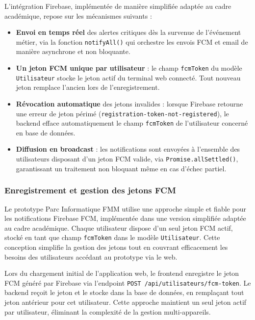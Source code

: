 L'intégration Firebase, implémentée de manière simplifiée adaptée au cadre académique, repose sur les mécanismes suivants :
\begin{itemize}
    \item \textbf{Envoi en temps réel} des alertes critiques dès la survenue
          de l'événement métier, via la fonction \texttt{notifyAll()} qui orchestre
          les envois FCM et email de manière asynchrone et non bloquante.
    \item \textbf{Un jeton FCM unique par utilisateur} : le champ \texttt{fcmToken}
          du modèle \texttt{Utilisateur} stocke le jeton actif du terminal web connecté.
          Tout nouveau jeton remplace l'ancien lors de l'enregistrement.
    \item \textbf{Révocation automatique} des jetons invalides : lorsque Firebase retourne
          une erreur de jeton périmé (\texttt{registration-token-not-registered}),
          le backend efface automatiquement le champ \texttt{fcmToken} de l'utilisateur
          concerné en base de données.
    \item \textbf{Diffusion en broadcast} : les notifications sont envoyées à l'ensemble
          des utilisateurs disposant d'un jeton FCM valide, via \texttt{Promise.allSettled()},
          garantissant un traitement non bloquant même en cas d'échec partiel.
\end{itemize}

\subsubsection{Enregistrement et gestion des jetons FCM}
\label{subsubsec:fcm_tokens}

Le prototype Parc Informatique FMM utilise une approche simple et fiable pour les notifications Firebase FCM, implémentée dans une version simplifiée adaptée au cadre académique. 
Chaque utilisateur dispose d'un seul jeton FCM actif, stocké en tant que champ \texttt{fcmToken} dans le modèle 
\texttt{Utilisateur}. Cette conception simplifie la gestion des jetons tout en couvrant efficacement les besoins 
des utilisateurs accédant au prototype via le web.

Lors du chargement initial de l'application web, le frontend enregistre le jeton FCM généré par Firebase via 
l'endpoint \texttt{POST /api/utilisateurs/fcm-token}. Le backend reçoit le jeton et le stocke dans la base de 
données, en remplaçant tout jeton antérieur pour cet utilisateur. Cette approche maintient un seul jeton actif 
par utilisateur, éliminant la complexité de la gestion multi-appareils.

